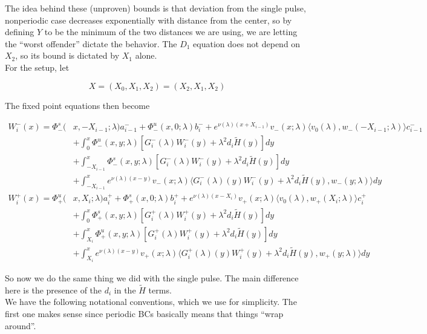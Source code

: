\documentclass[12pt]{article}
\begin{document}
The idea behind these (unproven) bounds is that deviation from the single pulse, nonperiodic case decreases exponentially with distance from the center, so by defining $Y$ to be the minimum of the two distances we are using, we are letting the ``worst offender'' dictate the behavior. The $D_1$ equation does not depend on $X_2$, so its bound is dictated by $X_1$ alone.\\

For the setup, let

\[
X = (X_0, X_1, X_2) = (X_2, X_1, X_2)
\]

The fixed point equations then become

\begin{align*}
W_i^-(x) = \Phi^s_-(&x, -X_{i-1}; \lambda)a_{i-1}^- + \Phi^u_-(x, 0; \lambda)b_i^- + e^{\nu(\lambda)(x+X_{i-1})} v_-(x; \lambda) \langle v_0(\lambda), w_-(-X_{i-1}; \lambda) \rangle c_{i-1}^- \\
&+ \int_0^x \Phi^u_-(x, y; \lambda)[ G_i^-(\lambda)W_i^-(y) + \lambda^2 d_i \tilde{H}(y) ] dy \\
&+ \int_{-X_{i-1}}^x \Phi^s_-(x, y; \lambda) [ G_i^-(\lambda)W_i^-(y) + \lambda^2 d_i \tilde{H}(y) ] dy \\
&+ \int_{-X_{i-1}}^x 
e^{\nu(\lambda)(x-y)} v_-(x; \lambda) \langle G_i^-(\lambda)(y)W_i^-(y) + \lambda^2 d_i \tilde{H}(y), w_-(y; \lambda) \rangle dy \\
W_i^+(x) = \Phi^u_+(&x, X_i; \lambda)a_i^+ + \Phi^s_+(x, 0; \lambda)b_i^+ + e^{\nu(\lambda)(x - X_i)} v_+(x; \lambda) \langle v_0(\lambda), w_+(X_i; \lambda) \rangle c_i^+ \\
&+ \int_0^x \Phi^s_+(x, y; \lambda) [ G_i^+(\lambda)W_i^+(y) + \lambda^2 d_i \tilde{H}(y) ] dy \\
&+ \int_{X_i}^x \Phi^u_+(x, y; \lambda) [ G_i^+(\lambda)W_i^+(y) + \lambda^2 d_i \tilde{H}(y) ] dy \\
&+ \int_{X_i}^x e^{\nu(\lambda)(x-y)} v_+(x; \lambda) \langle G_i^+(\lambda)(y)W_i^+(y) + \lambda^2 d_i \tilde{H}(y), w_+(y; \lambda) \rangle dy
\end{align*}

So now we do the same thing we did with the single pulse. The main difference here is the presence of the $d_i$ in the $\tilde{H}$ terms. \\

We have the following notational conventions, which we use for simplicity. The first one makes sense since periodic BCs basically means that things ``wrap around''.
\end{document}

